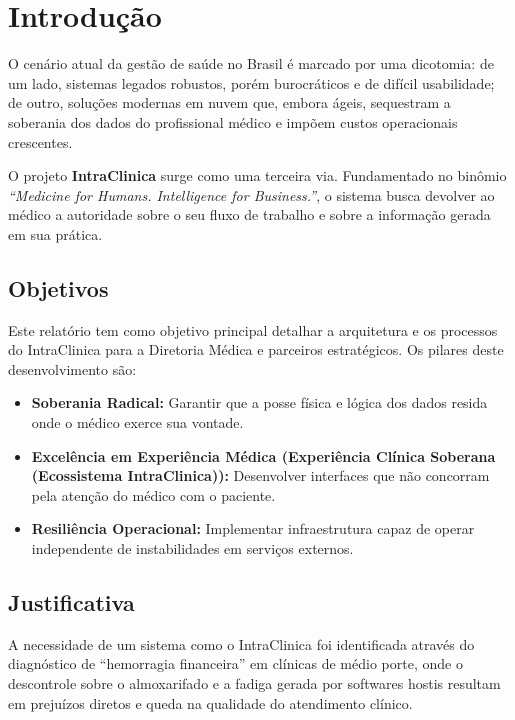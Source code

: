 \chapter{Introdução}

O cenário atual da gestão de saúde no Brasil é marcado por uma dicotomia: de um lado, sistemas legados robustos, porém burocráticos e de difícil usabilidade; de outro, soluções modernas em nuvem que, embora ágeis, sequestram a soberania dos dados do profissional médico e impõem custos operacionais crescentes.

O projeto \textbf{IntraClinica} surge como uma terceira via. Fundamentado no binômio \textit{``Medicine for Humans. Intelligence for Business.''}, o sistema busca devolver ao médico a autoridade sobre o seu fluxo de trabalho e sobre a informação gerada em sua prática.

\section{Objetivos}

Este relatório tem como objetivo principal detalhar a arquitetura e os processos do IntraClinica para a Diretoria Médica e parceiros estratégicos. Os pilares deste desenvolvimento são:

\begin{itemize}
    \item \textbf{Soberania Radical:} Garantir que a posse física e lógica dos dados resida onde o médico exerce sua vontade.
    \item \textbf{Excelência em Experiência Médica (Experiência Clínica Soberana (Ecossistema IntraClinica)):} Desenvolver interfaces que não concorram pela atenção do médico com o paciente.
    \item \textbf{Resiliência Operacional:} Implementar infraestrutura capaz de operar independente de instabilidades em serviços externos.
\end{itemize}

\section{Justificativa}

A necessidade de um sistema como o IntraClinica foi identificada através do diagnóstico de ``hemorragia financeira'' em clínicas de médio porte, onde o descontrole sobre o almoxarifado e a fadiga gerada por softwares hostis resultam em prejuízos diretos e queda na qualidade do atendimento clínico.
